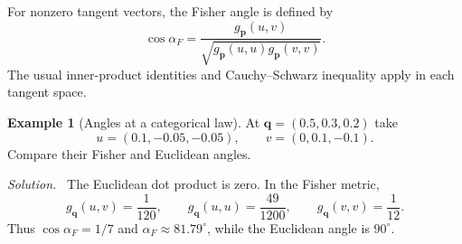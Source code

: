 \documentclass[11pt,oneside,openany]{book}
\theoremstyle{definition}
\newtheorem{example}{Example}[chapter]
\theoremstyle{remark}
\newenvironment{solution}{\par\smallskip\noindent\textit{Solution.}\ }{\par\smallskip}
\newcommand{\p}{\mathbf{p}}
\newcommand{\q}{\mathbf{q}}
\numberwithin{equation}{chapter}
\begin{document}
For nonzero tangent vectors, the Fisher angle is defined by
\[
\cos\alpha_F=\frac{g_\p(u,v)}{\sqrt{g_\p(u,u)g_\p(v,v)}}.
\]
The usual inner-product identities and Cauchy--Schwarz inequality apply in each tangent space.

\begin{example}[Angles at a categorical law]
At $\q=(0.5,0.3,0.2)$ take
\[
u=(0.1,-0.05,-0.05),\qquad v=(0,0.1,-0.1).
\]
Compare their Fisher and Euclidean angles.
\begin{solution}
The Euclidean dot product is zero. In the Fisher metric,
\[
g_\q(u,v)=\frac1{120},\qquad
g_\q(u,u)=\frac{49}{1200},\qquad
g_\q(v,v)=\frac1{12}.
\]
Thus $\cos\alpha_F=1/7$ and $\alpha_F\approx81.79^\circ$, while the Euclidean angle is $90^\circ$.
\end{solution}
\end{example}
\end{document}
